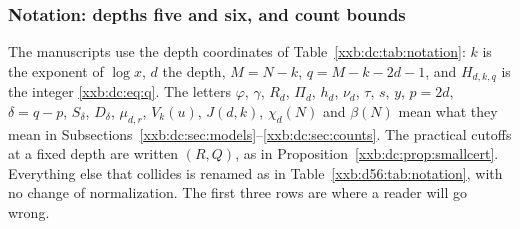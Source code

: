 \documentclass[11pt,a4paper]{article}
\numberwithin{equation}{section}
\theoremstyle{definition}
\theoremstyle{remark}
\theoremstyle{plain}
\begin{document}
\subsubsection{Notation: depths five and six, and count bounds}\label{xxb:d56:sec:notation}

The manuscripts use the depth coordinates of
Table~\ref{xxb:dc:tab:notation}: $k$ is the exponent of $\log x$, $d$ the
depth, $M=N-k$, $q=M-k-2d-1$, and $H_{d,k,q}$ is the integer
\eqref{xxb:dc:eq:q}.  The letters $\varphi$, $\gamma$, $R_d$, $\Pi_d$,
$h_d$, $\nu_d$, $\tau$, $s$, $y$, $p=2d$, $\delta=q-p$, $S_\delta$,
$D_\delta$, $\mu_{d,r}$, $V_k(u)$, $J(d,k)$, $\chi_d(N)$ and $\beta(N)$ mean what
they mean in Subsections~\ref{xxb:dc:sec:models}--\ref{xxb:dc:sec:counts}.
The practical cutoffs at a fixed depth are written $(R,Q)$, as in
Proposition~\ref{xxb:dc:prop:smallcert}.  Everything else that collides is
renamed as in Table~\ref{xxb:d56:tab:notation}, with no change of
normalization.  The first three rows are where a reader will go wrong.
\end{document}
